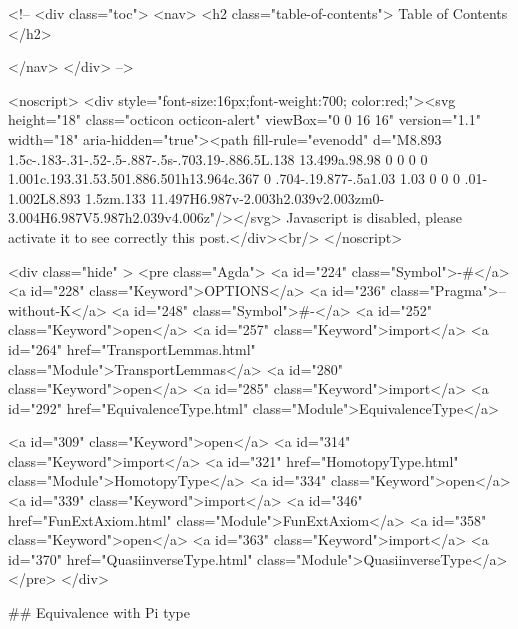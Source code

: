   <!-- 
  <div class="toc">
    <nav>
    <h2 class="table-of-contents"> Table of Contents </h2>
      

    </nav>
  </div>
   -->

  <noscript>
  <div style="font-size:16px;font-weight:700; color:red;"><svg height="18" class="octicon octicon-alert" viewBox="0 0 16 16" version="1.1" width="18" aria-hidden="true"><path fill-rule="evenodd" d="M8.893 1.5c-.183-.31-.52-.5-.887-.5s-.703.19-.886.5L.138 13.499a.98.98 0 0 0 0 1.001c.193.31.53.501.886.501h13.964c.367 0 .704-.19.877-.5a1.03 1.03 0 0 0 .01-1.002L8.893 1.5zm.133 11.497H6.987v-2.003h2.039v2.003zm0-3.004H6.987V5.987h2.039v4.006z"/></svg> Javascript is disabled, please activate it to see correctly this post.</div><br/>
  </noscript>

  <div class="hide" >
<pre class="Agda">
<a id="224" class="Symbol">{-#</a> <a id="228" class="Keyword">OPTIONS</a> <a id="236" class="Pragma">--without-K</a> <a id="248" class="Symbol">#-}</a>
<a id="252" class="Keyword">open</a> <a id="257" class="Keyword">import</a> <a id="264" href="TransportLemmas.html" class="Module">TransportLemmas</a>
<a id="280" class="Keyword">open</a> <a id="285" class="Keyword">import</a> <a id="292" href="EquivalenceType.html" class="Module">EquivalenceType</a>

<a id="309" class="Keyword">open</a> <a id="314" class="Keyword">import</a> <a id="321" href="HomotopyType.html" class="Module">HomotopyType</a>
<a id="334" class="Keyword">open</a> <a id="339" class="Keyword">import</a> <a id="346" href="FunExtAxiom.html" class="Module">FunExtAxiom</a>
<a id="358" class="Keyword">open</a> <a id="363" class="Keyword">import</a> <a id="370" href="QuasiinverseType.html" class="Module">QuasiinverseType</a>
</pre>
</div>


## Equivalence with Pi type

